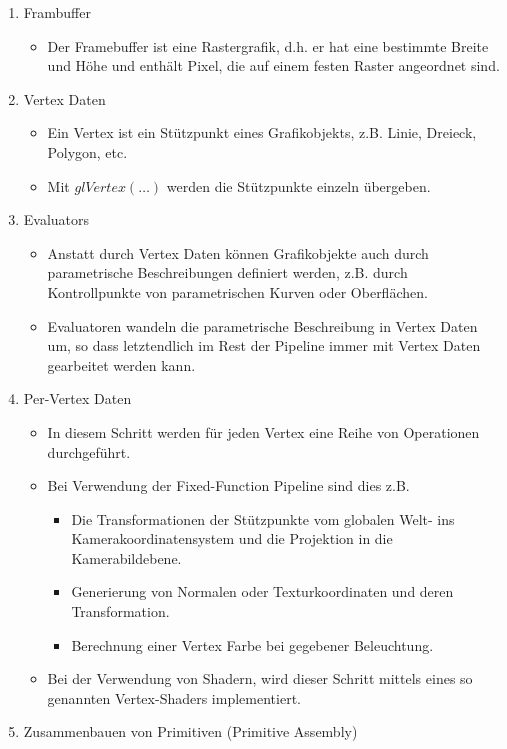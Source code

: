 \documentclass{scrartcl}
\begin{document}
\begin{enumerate}
	\item Frambuffer
	\begin{itemize}
		\item Der Framebuffer ist eine Rastergrafik, d.h. er hat eine bestimmte Breite und Höhe und enthält Pixel, die auf einem festen Raster angeordnet sind.
	\end{itemize}
	\item Vertex Daten
	\begin{itemize}
		\item Ein Vertex ist ein Stützpunkt eines Grafikobjekts, z.B. Linie, Dreieck, Polygon, etc.
		\item Mit $glVertex(\ldots)$ werden die Stützpunkte einzeln übergeben.
	\end{itemize}
	\item Evaluators
	\begin{itemize}
		\item Anstatt durch Vertex Daten können Grafikobjekte auch durch parametrische Beschreibungen definiert werden, z.B. durch Kontrollpunkte von parametrischen Kurven oder Oberflächen.
		\item Evaluatoren wandeln die parametrische Beschreibung in Vertex Daten um, so dass letztendlich im Rest der Pipeline immer mit Vertex Daten gearbeitet werden kann.
	\end{itemize}
	\item Per-Vertex Daten
	\begin{itemize}
		\item In diesem Schritt werden für jeden Vertex eine Reihe von Operationen durchgeführt.
		\item Bei Verwendung der Fixed-Function Pipeline sind dies z.B.
		\begin{itemize}
			\item Die Transformationen der Stützpunkte vom globalen Welt- ins Kamerakoordinatensystem und die Projektion in die Kamerabildebene.
			\item Generierung von Normalen oder Texturkoordinaten und deren Transformation.
			\item Berechnung einer Vertex Farbe bei gegebener Beleuchtung.
		\end{itemize}
		\item Bei der Verwendung von Shadern, wird dieser Schritt mittels eines so genannten Vertex-Shaders implementiert.
	\end{itemize}
	\item Zusammenbauen von Primitiven (Primitive Assembly)

\end{enumerate}
\end{document}
